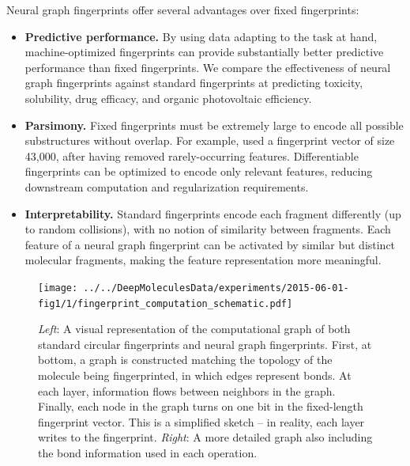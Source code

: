 \documentclass{article}
\begin{document}
Neural graph fingerprints offer several advantages over fixed fingerprints:
\begin{itemize}
\item {\bf Predictive performance.}
By using data adapting to the task at hand, machine-optimized fingerprints can provide substantially better predictive performance than fixed fingerprints.
We compare the effectiveness of neural graph fingerprints against standard fingerprints at predicting toxicity, solubility, drug efficacy, and organic photovoltaic efficiency.
\item {\bf Parsimony.}
Fixed fingerprints must be extremely large to encode all possible substructures without overlap.
For example, \cite{unterthinerdeep} used a fingerprint vector of size 43,000, after having removed rarely-occurring features.
Differentiable fingerprints can be optimized to encode only relevant features, reducing downstream computation and regularization requirements.
\item {\bf Interpretability.}
Standard fingerprints encode each fragment differently (up to random collisions), with no notion of similarity between fragments.
Each feature of a neural graph fingerprint can be activated by similar but distinct molecular fragments, making the feature representation more meaningful.
\end{itemize}

\begin{figure}
\centerline{\texttt{[image: ../../DeepMoleculesData/experiments/2015-06-01-fig1/1/fingerprint\_computation\_schematic.pdf]}
\hspace{5em}
}
\vspace{-1mm}
\caption{\emph{Left}: A visual representation of the computational graph of both standard circular fingerprints and neural graph fingerprints.
First, at bottom, a graph is constructed matching the topology of the molecule being fingerprinted, in which edges represent bonds.
At each layer, information flows between neighbors in the graph.
Finally, each node in the graph turns on one bit in the fixed-length fingerprint vector.
This is a simplified sketch -- in reality, each layer writes to the fingerprint.
\emph{Right}: A more detailed graph also including the bond information used in each operation.}
\label{fig:architecture sketch}
\end{figure}
\end{document}
